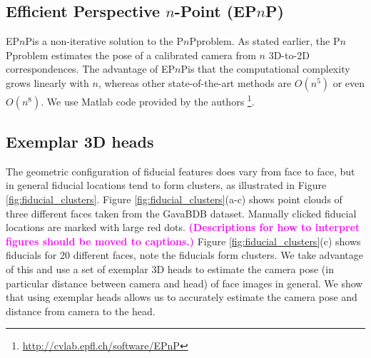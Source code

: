 \documentclass[runningheads]{llncs}
\newcommand {\ericnote} [1] {{\bf \textcolor{magenta}{(#1)}}}
\newcommand {\PnP} {P$n$P}
\newcommand {\EPnP} {EP$n$P}
\begin{document}
\subsection{Efficient Perspective $n$-Point (\EPnP)}
\EPnP is a non-iterative solution to the \PnP problem.  
As stated earlier, the \PnP problem estimates the pose of a calibrated camera from $n$ 3D-to-2D correspondences.  
The advantage of \EPnP is that the computational complexity grows linearly with $n$, whereas other state-of-the-art methods are $O(n^5)$ or even $O(n^8)$.  
We use Matlab code provided by the authors \footnote{\url{http://cvlab.epfl.ch/software/EPnP}}.

\subsection{Exemplar 3D heads}
The geometric configuration of fiducial features does vary from face to face, but in general fiducial locations tend to form clusters, as illustrated in Figure \ref{fig:fiducial_clusters}.  
Figure \ref{fig:fiducial_clusters}(a-c) shows point clouds of three different faces taken from the GavaBDB \cite{moreno2004gavabdb} dataset. 
Manually clicked fiducial locations are marked with large red dots.
\ericnote{Descriptions for how to interpret figures should be moved to captions.}
Figure \ref{fig:fiducial_clusters}(c) shows fiducials for 20 different faces, note the fiducials form clusters.  
We take advantage of this and use a set of exemplar 3D heads to estimate the camera pose (in particular distance between camera and head) of face images in general. 
We show that using exemplar heads allows us to accurately estimate the camera pose and distance from camera to the head.
\end{document}
